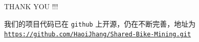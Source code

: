 \documentclass[11pt,aspectratio=149]{ctexbeamer}
\begin{document}
\begin{frame}[plain]

{\Huge THANK YOU !!!}


\vspace{2cm}
我们的项目代码已在 \texttt{github} 上开源，仍在不断完善，地址为 \href{https://github.com/HaoiJhang/Shared-Bike-Mining.git}{\texttt{https://github.com/HaoiJhang/Shared-Bike-Mining.git}}
\end{frame}
\end{document}
